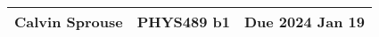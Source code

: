 \documentclass[a4paper, 12pt]{config/homework}
\begin{document}
\noindent
\begin{tabularx}{\textwidth}{>{\centering\arraybackslash}X>{\centering\arraybackslash}X>{\centering\arraybackslash}X}
Calvin Sprouse & PHYS489 b1 & Due 2024 Jan 19\\
\midrule
\end{tabularx}

\end{document}
